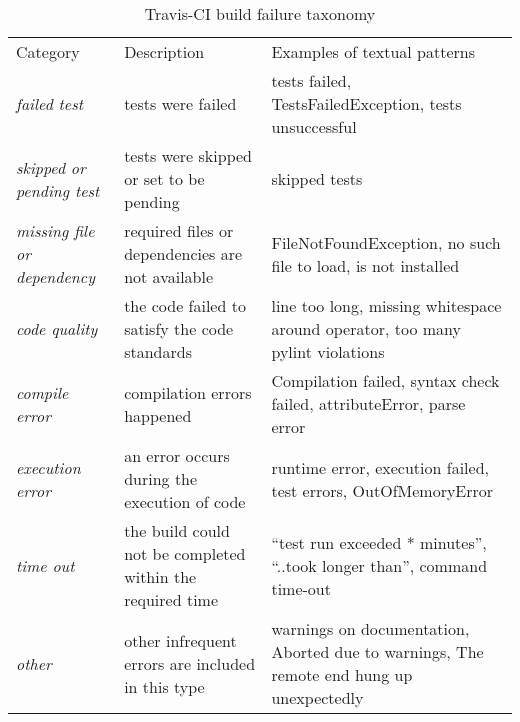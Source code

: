 
\begin{table}[t] \centering
\small
  \caption{Travis-CI build failure taxonomy
  \vspace{-0.2cm}
  }
  \label{error_types}

\begin{tabular}{ p{1.5cm}  p{2.5cm}  p{4cm} }
	
\hline 
\\[-1.8ex]\hline
Category & Description & Examples of textual patterns \\ \hline 
\emph{failed test} & tests were failed & tests failed, TestsFailedException, tests unsuccessful\\ \hline
\emph{skipped or pending test} & tests were skipped or set to be pending & skipped tests \\ \hline
\emph{missing file or dependency} & required files or dependencies are not available &  FileNotFoundException, no such file to load, is not installed \\ \hline
\emph{code quality} & the code failed to satisfy the code standards & line too long, missing whitespace around operator, too many pylint violations \\ \hline
\emph{compile error} &compilation errors happened & Compilation failed, syntax check failed, attributeError, parse error\\ \hline
\emph{execution error} &an error occurs during the execution of code & runtime error, execution failed, test errors, OutOfMemoryError\\ \hline
\emph{time out} & the build could not be completed within the required time&“test run exceeded * minutes”, “..took longer than”, command time-out \\ \hline 
\emph{other} &other infrequent errors are included in this type & warnings on documentation, Aborted due to warnings, The remote end hung up unexpectedly \\
\hline

\end{tabular}

\end{table}

